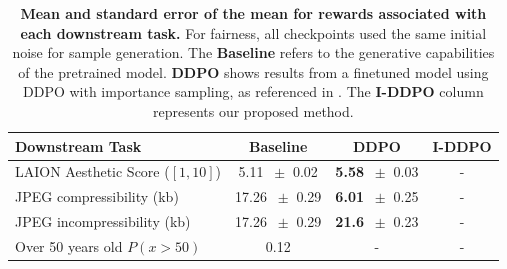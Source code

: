 \begin{table}
\centering
\begin{tabular}{lccc}
\toprule
\textbf{Downstream Task} & \textbf{Baseline} & \textbf{DDPO} & \textbf{I-DDPO}\\
\midrule
LAION Aesthetic Score ($[1,10]$) & 5.11 $~\pm$ 0.02 & \textbf{5.58} $~\pm$ 0.03 & - \\
JPEG compressibility (kb) & 17.26 $~\pm$  0.29 & \textbf{6.01} $~\pm$ 0.25  & -\\
JPEG incompressibility (kb) & 17.26 $~\pm$ 0.29 & \textbf{21.6} $~\pm$ 0.23 & - \\
Over 50 years old $P(x>\text{50})$ & 0.12 & - & - \\
\bottomrule
\end{tabular}
\captionsetup{width=\textwidth} %
\caption{\textbf{Mean and standard error of the mean for rewards associated with each downstream task.} For fairness, all checkpoints used the same initial noise for sample generation. The \textbf{Baseline} refers to the generative capabilities of the pretrained model. \textbf{DDPO} shows results from a finetuned model using DDPO with importance sampling, as referenced in \cite{black2023training}. The \textbf{I-DDPO} column represents our proposed method.}
\end{table}




